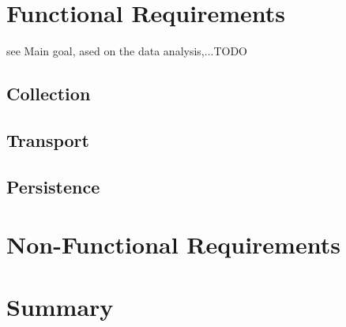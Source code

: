 \section{Functional Requirements}
see Main goal, ased on the data analysis,...TODO

%
\subsection{Collection}

\subsection{Transport}

\subsection{Persistence}

\section{Non-Functional Requirements}

\section{Summary}
